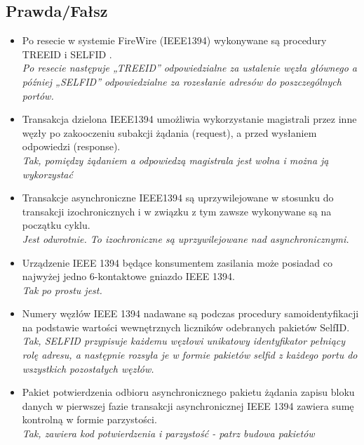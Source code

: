 \subsection*{Prawda/Fałsz}
\begin{itemize}
	
	\item \textcolor{tak}{Po resecie w systemie FireWire (IEEE1394) wykonywane są procedury TREEID  i SELFID .} \\
	{\small \emph{Po resecie następuje „TREEID” odpowiedzialne za ustalenie węzła głównego a później „SELFID” odpowiedzialne za rozesłanie adresów do poszczególnych portów.}}
	
	\item \textcolor{tak}{Transakcja dzielona IEEE1394 umożliwia wykorzystanie magistrali przez inne węzły po zakooczeniu subakcji żądania (request), a przed wysłaniem odpowiedzi (response).} \\
	{\small \emph{Tak, pomiędzy żądaniem a odpowiedzą magistrala jest wolna i można ją wykorzystać}}
	
	\item \textcolor{nie}{Transakcje asynchroniczne IEEE1394 są uprzywilejowane w stosunku do transakcji izochronicznych i w związku z tym zawsze wykonywane są na początku cyklu.} \\
	{\small \emph{Jest odwrotnie. To izochroniczne są uprzywilejowane nad asynchronicznymi.}}
	
	\item \textcolor{tak}{Urządzenie IEEE 1394 będące konsumentem zasilania może posiadad co najwyżej jedno 6-kontaktowe gniazdo IEEE 1394.} \\
	{\small \emph{Tak po prostu jest.}}
	
	\item \textcolor{tak}{Numery węzłów IEEE 1394 nadawane są podczas procedury samoidentyfikacji na podstawie wartości wewnętrznych liczników odebranych pakietów SelfID.} \\
	{\small \emph{Tak, SELFID przypisuje każdemu węzłowi unikatowy identyfikator pełniący rolę adresu, a następnie rozsyła je w formie pakietów selfid z każdego portu do wszystkich pozostałych węzłów.}}
	
	\item \textcolor{tak}{Pakiet potwierdzenia odbioru asynchronicznego pakietu żądania zapisu bloku danych w pierwszej fazie transakcji asynchronicznej IEEE 1394 zawiera sumę kontrolną w formie parzystości.} \\
	{\small \emph{Tak, zawiera kod potwierdzenia i parzystość - patrz budowa pakietów}}
	

\end{itemize}

